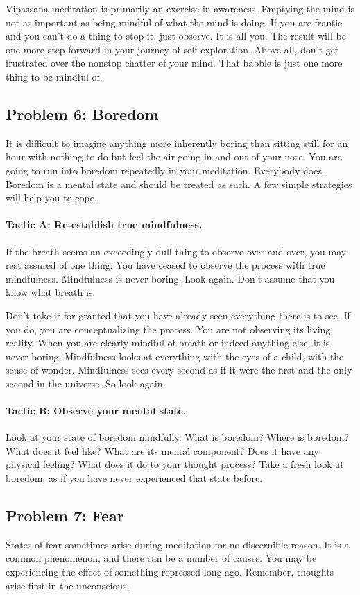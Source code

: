 Vipassana meditation is primarily an exercise in awareness. Emptying the mind is
not as important as being mindful of what the mind is doing. If you are frantic
and you can't do a thing to stop it, just observe. It is all you. The result
will be one more step forward in your journey of self-exploration. Above all,
don't get frustrated over the nonstop chatter of your mind. That babble is just
one more thing to be mindful of.

\subsection*{Problem 6: Boredom}
It is difficult to imagine anything more inherently boring than sitting still
for an hour with nothing to do but feel the air going in and out of your nose.
You are going to run into boredom repeatedly in your meditation. Everybody does.
Boredom is a mental state and should be treated as such. A few simple strategies
will help you to cope.

\paragraph*{Tactic A: Re-establish true mindfulness.} If the breath seems an exceedingly dull
thing to observe over and over, you may rest assured of one thing: You have
ceased to observe the process with true mindfulness. Mindfulness is never
boring. Look again. Don't assume that you know what breath is.

Don't take it for granted that you have already seen everything there is to see.
If you do, you are conceptualizing the process. You are not observing its living
reality. When you are clearly mindful of breath or indeed anything else, it is
never boring. Mindfulness looks at everything with the eyes of a child, with the
sense of wonder. Mindfulness sees every second as if it were the first and the
only second in the universe. So look again.

\paragraph*{Tactic B: Observe your mental state.} Look at your state of boredom mindfully.
What is boredom? Where is boredom? What does it feel like? What are its mental
component? Does it have any physical feeling? What does it do to your thought
process? Take a fresh look at boredom, as if you have never experienced that
state before.

\subsection*{Problem 7: Fear} States of fear sometimes arise during meditation for no
discernible reason. It is a common phenomenon, and there can be a number of
causes. You may be experiencing the effect of something repressed long ago.
Remember, thoughts arise first in the unconscious.

